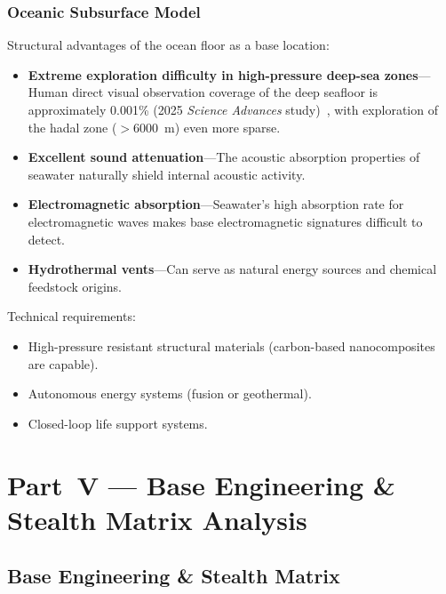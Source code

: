 \documentclass[aps,prd,twocolumn,superscriptaddress,nofootinbib]{revtex4-2}
\begin{document}
\subsubsection{Oceanic Subsurface Model}\label{sec:oceanic}

Structural advantages of the ocean floor as a base location:

\begin{itemize}
  \item \textbf{Extreme exploration difficulty in high-pressure deep-sea zones}---Human direct visual observation coverage of the deep seafloor is approximately 0.001\% (2025 \textit{Science Advances} study)~\cite{DeepSea2025}, with exploration of the hadal zone ($>$\SI{6000}{m}) even more sparse.
  \item \textbf{Excellent sound attenuation}---The acoustic absorption properties of seawater naturally shield internal acoustic activity.
  \item \textbf{Electromagnetic absorption}---Seawater's high absorption rate for electromagnetic waves makes base electromagnetic signatures difficult to detect.
  \item \textbf{Hydrothermal vents}---Can serve as natural energy sources and chemical feedstock origins.
\end{itemize}

Technical requirements:

\begin{itemize}
  \item High-pressure resistant structural materials (carbon-based nanocomposites are capable).
  \item Autonomous energy systems (fusion or geothermal).
  \item Closed-loop life support systems.
\end{itemize}


\section{Part~V --- Base Engineering \& Stealth Matrix Analysis}\label{sec:part5}

\subsection{Base Engineering \& Stealth Matrix}\label{sec:base-engineering}
\end{document}
